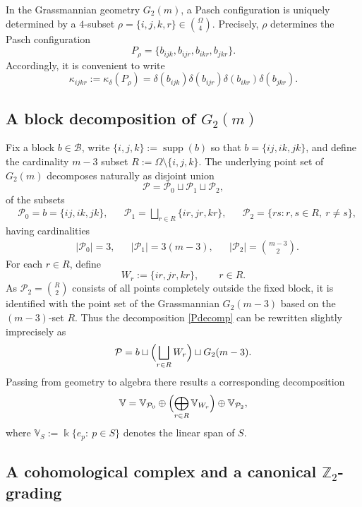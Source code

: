 \documentclass[10pt,a4paper]{amsart}
\numberwithin{equation}{section}
\newcommand\fie{\Bbbk}
\def\valg{\mathbb{V}}
\DeclareMathOperator{\supp}{supp}
\begin{document}
In the Grassmannian geometry $G_2(m)$, a Pasch configuration is uniquely determined by a $4$-subset
$\rho = \{i,j,k,r\}\in\binom{\Omega}{4}$. Precisely, $\rho$ determines the Pasch configuration
$$
P_\rho
=
\{
b_{ijk},
b_{ijr},
b_{ikr},
b_{jkr}
\}.
$$
Accordingly, it is convenient to write
\begin{equation}\label{kappaijkr}
\kappa_{ijkr}
:=
\kappa_\delta(P_\rho)
=
\delta(b_{ijk})
\delta(b_{ijr})
\delta(b_{ikr})
\delta(b_{jkr}).
\end{equation}




\subsection{A block decomposition of $G_2(m)$}\label{sec:proof}
Fix a block $b\in\mathcal B$, write $\{i,j,k\}:=\supp(b)$ so that $b=\{ij,ik,jk\}$, and define the cardinality $m-3$ subset $R:=\Omega\setminus\{i,j,k\}$. The underlying point set of $G_2(m)$ decomposes naturally as disjoint union
\begin{equation}\label{Pdecomp}
\mathcal{P}
=
\mathcal{P}_0
\sqcup
\mathcal{P}_1
\sqcup
\mathcal{P}_2,
\end{equation}
of the subsets
\begin{align*}
&\mathcal{P}_0=
b
=
\{ij,ik,jk\},&
&\mathcal{P}_1=
\bigsqcup_{r\in R}
\{ir,jr,kr\},
&&
\mathcal{P}_2=
\{rs:r,s\in R,\ r\ne s\},
\end{align*}
having cardinalities
\begin{align*}
&|\mathcal{P}_0|=3,&&
|\mathcal{P}_1|=3(m-3),&&
|\mathcal{P}_2|=\binom{m-3}{2}.
\end{align*}
For each $r\in R$, define
$$
W_r:=\{ir,jr,kr\},
\qquad
r\in R.
$$
As $\mathcal{P}_2 =
\binom{R}{2}$ consists of all points completely outside the fixed block, it is identified with the point set of the Grassmannian
$G_2(m-3)$ based on the $(m-3)$-set $R$. Thus the decomposition \eqref{Pdecomp} can be rewritten slightly imprecisely as
$$
\mathcal{P}
=
b
\sqcup
\Bigl(
\bigsqcup_{r\in R}W_r
\Bigr)
\sqcup
G_2(m-3).
$$
Passing from geometry to algebra there results a corresponding decomposition
\begin{equation}\label{Vdecomp}
\valg
=
\valg_{\mathcal{P}_0}
\oplus
\Bigl(
\bigoplus_{r\in R}\valg_{W_r}
\Bigr)
\oplus
\valg_{\mathcal{P}_2},
\end{equation}
where
$\valg_S
:=
\fie\{ e_p:\ p\in S\}$
denotes the linear span of $S$.


\subsection{A cohomological complex and a canonical $\mathbb Z_2$-grading}\label{sec:d-complex}
\end{document}
